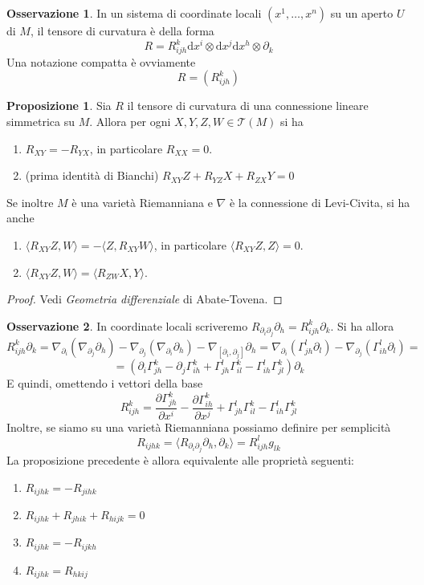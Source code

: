 \documentclass[a4paper,11pt]{article}
\theoremstyle{definition}
\newtheorem{osservazione}{Osservazione}[section]
\theoremstyle{theorem}
\newtheorem{proposizione}{Proposizione}[section]
\newcommand{\dif}{\mathrm{d}}
\newcommand{\T}{\mathcal{T}}
\begin{document}
\begin{osservazione}
	In un sistema di coordinate locali $(x^1,\dots,x^n)$ su un aperto $U$ di $M$, il tensore di curvatura è della forma
	\[R=R_{ijh}^k\dif x^i\otimes\dif x^j\dif x^h\otimes\partial_k\]
	Una notazione compatta è ovviamente
	\[R=\left(R_{ijh}^k\right)\]
\end{osservazione}
\begin{proposizione}
	Sia $R$ il tensore di curvatura di una connessione lineare simmetrica su $M$. Allora per ogni $X,Y,Z,W\in\T(M)$ si ha
	\begin{enumerate}
		\item $R_{XY}=-R_{YX}$, in particolare $R_{XX}=0$.
		\item (prima identità di Bianchi) $R_{XY}Z+R_{YZ}X+R_{ZX}Y=0$
	\end{enumerate}
	Se inoltre $M$ è una varietà Riemanniana e $\nabla$ è la connessione di Levi-Civita, si ha anche
	\begin{enumerate}[resume]
		\item $\langle R_{XY}Z,W\rangle=-\langle Z,R_{XY}W\rangle$, in particolare $\langle R_{XY}Z,Z\rangle=0$.
		\item  $\langle R_{XY}Z,W\rangle=\langle R_{ZW}X,Y\rangle$.
	\end{enumerate}
\end{proposizione}
\begin{proof}
	Vedi \textit{Geometria differenziale} di Abate-Tovena.
\end{proof}
\begin{osservazione}
	In coordinate locali scriveremo $R_{\partial_i\partial_j}\partial_h=R_{ijh}^k\partial_k$. Si ha allora
	\[R_{ijh}^k\partial_k=\nabla_{\partial_i}\left(\nabla_{\partial_j}\partial_h\right)-\nabla_{\partial_j}\left(\nabla_{\partial_i}\partial_h\right)-\nabla_{[\partial_i,\partial_j]}\partial_h=\nabla_{\partial_i}\left(\Gamma^l_{jh}\partial_l\right)-\nabla_{\partial_j}\left(\Gamma^l_{ih}\partial_l\right)=\]\[=\left(\partial_i\Gamma^k_{jh}-\partial_j\Gamma^k_{ih}+\Gamma^l_{jh}\Gamma^k_{il}-\Gamma^{l}_{ih}\Gamma^k_{jl}\right)\partial_k\]
	E quindi, omettendo i vettori della base
	\[R_{ijh}^k=\frac{\partial\Gamma^k_{jh}}{\partial x^i}-\frac{\partial\Gamma^k_{ih}}{\partial x^j}+\Gamma^l_{jh}\Gamma^k_{il}-\Gamma^{l}_{ih}\Gamma^k_{jl}\]
	Inoltre, se siamo su una varietà Riemanniana possiamo definire per semplicità
	\[R_{ijhk}=\langle R_{\partial_i\partial_j}\partial_h,\partial_k\rangle=R_{ijh}^lg_{lk}\]
	La proposizione precedente è allora equivalente alle proprietà seguenti:
	\begin{enumerate}
		\item $R_{ijhk}=-R_{jihk}$
		\item $R_{ijhk}+R_{jhik}+R_{hijk}=0$
		\item $R_{ijhk}=-R_{ijkh}$
		\item $R_{ijhk}=R_{hkij}$
	\end{enumerate}
\end{osservazione}
\end{document}
